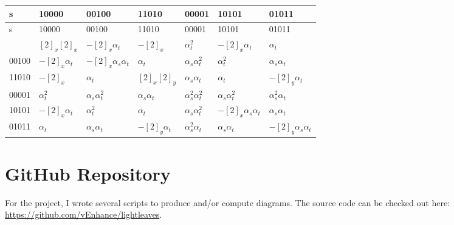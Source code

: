 \begin{longtable}{|l||p{2.1cm}|p{2.1cm}|p{2.1cm}|p{2.1cm}|p{2.1cm}|p{2.1cm}|}
\hline
s & 10000 & 00100 & 11010 & 00001 & 10101 & 01011 \\ \hline
\endfirsthead
s & 10000 & 00100 & 11010 & 00001 & 10101 & 01011 \\ \hline
\endhead
\endfoot
\hline
\endlastfoot
10000
& $[2]_x[2]_x$ %
& $-[2]_x\alpha_t$ %
& $-[2]_x$ %
& $\alpha_t^2$ %
& $-[2]_x\alpha_t$ %
& $\alpha_t$ %
\\
00100
& $-[2]_x\alpha_t$ %
& $-[2]_x\alpha_s\alpha_t$ %
& $\alpha_t$ %
& $\alpha_s\alpha_t^2$ %
& $\alpha_t^2$ %
& $\alpha_s\alpha_t$ %
\\
11010
& $-[2]_x$ %
& $\alpha_t$ %
& $[2]_x[2]_y$ %
& $\alpha_s\alpha_t$ %
& $\alpha_t$ %
& $-[2]_y\alpha_t$ %
\\
00001
& $\alpha_t^2$ %
& $\alpha_s\alpha_t^2$ %
& $\alpha_s\alpha_t$ %
& $\alpha_s^2\alpha_t^2$ %
& $\alpha_s\alpha_t^2$ %
& $\alpha_s^2\alpha_t$ %
\\
10101
& $-[2]_x\alpha_t$ %
& $\alpha_t^2$ %
& $\alpha_t$ %
& $\alpha_s\alpha_t^2$ %
& $-[2]_x\alpha_s\alpha_t$ %
& $\alpha_s\alpha_t$ %
\\
01011
& $\alpha_t$ %
& $\alpha_s\alpha_t$ %
& $-[2]_y\alpha_t$ %
& $\alpha_s^2\alpha_t$ %
& $\alpha_s\alpha_t$ %
& $-[2]_y\alpha_s\alpha_t$ %
\\
\end{longtable}

% 
\section{GitHub Repository}
For the project, I wrote several scripts to produce and/or compute diagrams.  The source code can be checked out here: \url{https://github.com/vEnhance/lightleaves}.
